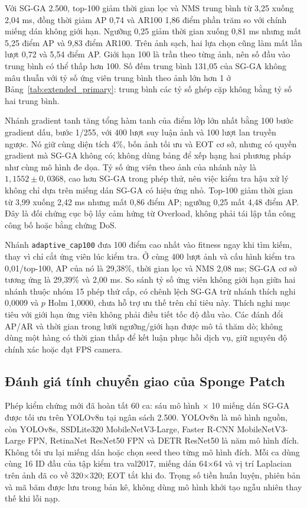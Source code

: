 \documentclass[a4paper,fleqn]{cas-dc}
\begin{document}
Với SG-GA 2.500, top-100 giảm thời gian lọc và NMS trung bình từ 3,25 xuống 2,04 ms, đồng thời giảm AP 0,74 và AR100 1,86 điểm phần trăm so với chính miếng dán không giới hạn. Ngưỡng 0,25 giảm thời gian xuống 0,81 ms nhưng mất 5,25 điểm AP và 9,83 điểm AR100. Trên ảnh sạch, hai lựa chọn cũng làm mất lần lượt 0,72 và 5,54 điểm AP. Giới hạn 100 là trần theo từng ảnh, nên số đầu vào trung bình có thể thấp hơn 100. Số đếm trung bình 131,05 của SG-GA không mâu thuẫn với tỷ số ứng viên trung bình theo ảnh lớn hơn 1 ở Bảng~\ref{tab:extended_primary}: trung bình các tỷ số ghép cặp không bằng tỷ số hai trung bình.

Nhánh gradient tanh tăng tổng hàm tanh của điểm lớp lớn nhất bằng 100 bước gradient dấu, bước 1/255, với 400 lượt suy luận ảnh và 100 lượt lan truyền ngược. Nó giữ cùng diện tích 4\%, bốn ảnh tối ưu và EOT cơ sở, nhưng có quyền gradient mà SG-GA không có; không dùng bảng để xếp hạng hai phương pháp như cùng mô hình đe dọa. Tỷ số ứng viên theo ảnh của nhánh này là $1{,}1552\pm0{,}0368$, cao hơn SG-GA trong phép thử, nên việc kiểm tra hậu xử lý không chỉ dựa trên miếng dán SG-GA có hiệu ứng nhỏ. Top-100 giảm thời gian từ 3,99 xuống 2,42 ms nhưng mất 0,86 điểm AP; ngưỡng 0,25 mất 4,48 điểm AP. Đây là đối chứng cục bộ lấy cảm hứng từ Overload, không phải tái lập tấn công công bố hoặc bằng chứng DoS.

Nhánh \texttt{adaptive\_cap100} đưa 100 điểm cao nhất vào fitness ngay khi tìm kiếm, thay vì chỉ cắt ứng viên lúc kiểm tra. Ở cùng 400 lượt ảnh và cấu hình kiểm tra 0,01/top-100, AP của nó là 29,38\%, thời gian lọc và NMS 2,08 ms; SG-GA cơ sở tương ứng là 29,39\% và 2,00 ms. So sánh tỷ số ứng viên không giới hạn giữa hai nhánh thuộc nhóm 15 phép thứ cấp, có chênh lệch SG-GA trừ nhánh thích nghi 0,0009 và $p$ Holm 1,0000, chưa hỗ trợ ưu thế trên chỉ tiêu này. Thích nghi mục tiêu với giới hạn ứng viên không phải điều tiết tốc độ đầu vào. Các đánh đổi AP/AR và thời gian trong lưới ngưỡng/giới hạn được mô tả thăm dò; không dùng một hàng có thời gian thấp để kết luận phục hồi dịch vụ, giữ nguyên độ chính xác hoặc đạt FPS camera.

\subsection{Đánh giá tính chuyển giao của Sponge Patch}

Phép kiểm chứng mới đã hoàn tất 60 ca: sáu mô hình × 10 miếng dán SG-GA được tối ưu trên YOLOv8n tại ngân sách 2.500. YOLOv8n là mô hình nguồn, còn YOLOv8s, SSDLite320 MobileNetV3-Large, Faster R-CNN MobileNetV3-Large FPN, RetinaNet ResNet50 FPN và DETR ResNet50 là năm mô hình đích. Không tối ưu lại miếng dán hoặc chọn seed theo từng mô hình đích. Mỗi ca dùng cùng 16 ID đầu của tập kiểm tra val2017, miếng dán 64×64 và vị trí Laplacian trên ảnh đã co về 320×320; EOT tắt khi đo. Trọng số tiền huấn luyện, phiên bản và mã băm được lưu trong bản kê, không dùng mô hình khởi tạo ngẫu nhiên thay thế khi lỗi nạp.
\end{document}
